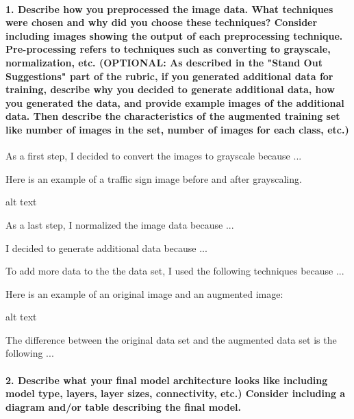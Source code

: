 \documentclass[11pt]{article}
\begin{document}
\paragraph{1. Describe how you preprocessed the image data. What
techniques were chosen and why did you choose these techniques? Consider
including images showing the output of each preprocessing technique.
Pre-processing refers to techniques such as converting to grayscale,
normalization, etc. (OPTIONAL: As described in the "Stand Out
Suggestions" part of the rubric, if you generated additional data for
training, describe why you decided to generate additional data, how you
generated the data, and provide example images of the additional data.
Then describe the characteristics of the augmented training set like
number of images in the set, number of images for each class,
etc.)}\label{describe-how-you-preprocessed-the-image-data.-what-techniques-were-chosen-and-why-did-you-choose-these-techniques-consider-including-images-showing-the-output-of-each-preprocessing-technique.-pre-processing-refers-to-techniques-such-as-converting-to-grayscale-normalization-etc.-optional-as-described-in-the-stand-out-suggestions-part-of-the-rubric-if-you-generated-additional-data-for-training-describe-why-you-decided-to-generate-additional-data-how-you-generated-the-data-and-provide-example-images-of-the-additional-data.-then-describe-the-characteristics-of-the-augmented-training-set-like-number-of-images-in-the-set-number-of-images-for-each-class-etc.}

As a first step, I decided to convert the images to grayscale because
...

Here is an example of a traffic sign image before and after grayscaling.

alt text

As a last step, I normalized the image data because ...

I decided to generate additional data because ...

To add more data to the the data set, I used the following techniques
because ...

Here is an example of an original image and an augmented image:

alt text

The difference between the original data set and the augmented data set
is the following ...

\paragraph{2. Describe what your final model architecture looks like
including model type, layers, layer sizes, connectivity, etc.) Consider
including a diagram and/or table describing the final
model.}\label{describe-what-your-final-model-architecture-looks-like-including-model-type-layers-layer-sizes-connectivity-etc.-consider-including-a-diagram-andor-table-describing-the-final-model.}
\end{document}

